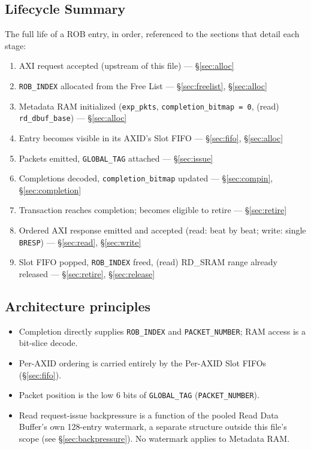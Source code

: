 \subsection*{Lifecycle Summary}
The full life of a ROB entry, in order, referenced to the sections that detail each stage:
\begin{enumerate}[noitemsep]
  \item AXI request accepted (upstream of this file) --- \S\ref{sec:alloc}
  \item \texttt{ROB\_INDEX} allocated from the Free List --- \S\ref{sec:freelist}, \S\ref{sec:alloc}
  \item Metadata RAM initialized (\texttt{exp\_pkts}, \texttt{completion\_bitmap = 0}, (read) \texttt{rd\_dbuf\_base}) --- \S\ref{sec:alloc}
  \item Entry becomes visible in its AXID's Slot FIFO --- \S\ref{sec:fifo}, \S\ref{sec:alloc}
  \item Packets emitted, \texttt{GLOBAL\_TAG} attached --- \S\ref{sec:issue}
  \item Completions decoded, \texttt{completion\_bitmap} updated --- \S\ref{sec:compin}, \S\ref{sec:completion}
  \item Transaction reaches completion; becomes eligible to retire --- \S\ref{sec:retire}
  \item Ordered AXI response emitted and accepted (read: beat by beat; write: single \texttt{BRESP}) --- \S\ref{sec:read}, \S\ref{sec:write}
  \item Slot FIFO popped, \texttt{ROB\_INDEX} freed, (read) RD\_SRAM range already released --- \S\ref{sec:retire}, \S\ref{sec:release}
\end{enumerate}

\subsection*{Architecture principles}
\begin{itemize}[noitemsep]
  \item Completion directly supplies \texttt{ROB\_INDEX} and \texttt{PACKET\_NUMBER}; RAM access is a bit-slice decode.
  \item Per-AXID ordering is carried entirely by the Per-AXID Slot FIFOs (\S\ref{sec:fifo}).
  \item Packet position is the low 6 bits of \texttt{GLOBAL\_TAG} (\texttt{PACKET\_NUMBER}).
  \item Read request-issue backpressure is a function of the pooled Read Data Buffer's own 128-entry watermark, a separate structure outside this file's scope (see \S\ref{sec:backpressure}). No watermark applies to Metadata RAM.
\end{itemize}

